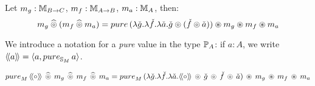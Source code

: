 \begin{lemma}\label{lemma:pappl_comp_appl}
Let $m_g:\mathbb{M}_{B\rightarrow C}$, $m_f:\mathbb{M}_{A\rightarrow B}$, $m_a:\mathbb{M}_{A}$, then:
$$
m_g \alift{\pappl} (m_f \alift{\pappl} m_a)
 = \apure\, (\lambda \pstr{g}. \lambda \pstr{f}. \lambda \pstr{a}. \pstr{g} \pappl (\pstr{f}\pappl \pstr{a})) \appl m_g \appl m_f \appl m_a
$$
\end{lemma}

We introduce a notation for a {\em pure} value in the type $\mathbb{P}_{A}$:
if $a:A$, we write $\ppair{a} = \langle a, \apure_{\stream{M}}\,a \rangle$.

\begin{lemma}\label{lemma:ppair}
$$
\apure_M\,\ppair{\comp}\, \alift{\pappl}\, m_g\, \alift{\pappl}\, m_f\, \alift{\pappl}\, m_a
= \apure_M\,(\lambda \pstr{g}. \lambda \pstr{f}. \lambda \pstr{a}. \ppair{\comp}\, \pappl\, \pstr{g} \, \pappl\, \pstr{f} \, \pappl\, \pstr{a})\, \appl\, m_g\, \appl\, m_f\, \appl\, m_a 
$$
\end{lemma}


